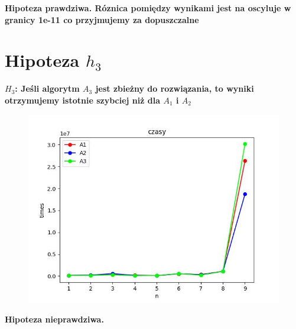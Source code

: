 \documentclass{article}
\begin{document}
\textbf{Hipoteza prawdziwa. Róznica pomiędzy wynikami jest na oscyluje w granicy 1e-11 co przyjmujemy za dopuszczalne} 


\clearpage

\section{Hipoteza $h_3$}

\textbf{$H_3$: Jeśli algorytm $A_3$ jest zbieżny do rozwiązania, to wyniki otrzymujemy istotnie szybciej niż dla $A_1$ i $A_2$}

\begin{figure}[ht!]
    \centering
    \includegraphics[width=1\linewidth]{czasy.jpg}
    \label{fig:enter-label}
\end{figure}



\textbf{Hipoteza nieprawdziwa.} 
\end{document}
